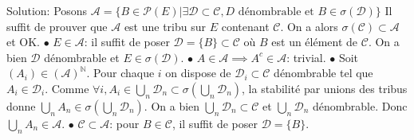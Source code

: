 \documentclass{report}
\begin{document}
Solution: Posons $\mathcal A = \{B\in \mathcal{P}(E) | \exists \mathcal D \subset \mathcal C, D\text{ dénombrable et } B\in \sigma(\mathcal D)   \} $\newline
Il suffit de prouver que $\mathcal A$ est une tribu sur $E$ contenant $\mathcal C$. On a alors $\sigma(\mathcal C) \subset \mathcal A$ et OK.\newline
$\bullet$ $E\in \mathcal A$: il suffit de poser $\mathcal D = \{B\} \subset \mathcal C$ où $B$ est un élément de $\mathcal C$. On a bien $\mathcal D$ dénombrable et $E\in \sigma(\mathcal D)$.\newline
$\bullet$ $A\in \mathcal A \implies A^c\in \mathcal A$: trivial.\newline
$\bullet$ Soit $(A_i)\in (\mathcal A)^{\mathbb N}$. Pour chaque $i$ on dispose de $\mathcal D_i\subset \mathcal C$ dénombrable tel que $A_i\in \mathcal D_i$. Comme $\displaystyle \forall i, A_i\in \bigcup_n \mathcal D_n\subset \sigma(\bigcup_n \mathcal D_n)$, la stabilité par unions des tribus donne $\displaystyle \bigcup_n A_n\in \sigma(\bigcup_n \mathcal D_n)$. On a bien $\bigcup_n \mathcal D_n \subset \mathcal C$ et $\bigcup_n \mathcal D_n$ dénombrable. Donc $\bigcup_n A_n \in \mathcal A$.\newline
$\bullet$ $\mathcal C \subset \mathcal A$: pour $B\in \mathcal C$, il suffit de poser $\mathcal D =\{B\}$.

\subsection{}
\\ \\
\end{document}

